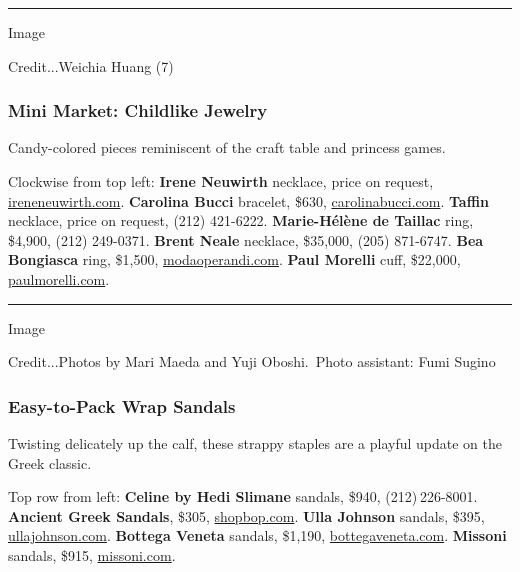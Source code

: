 \begin{center}\rule{0.5\linewidth}{\linethickness}\end{center}

Image

Credit...Weichia Huang (7)

\hypertarget{mini-market-childlike-jewelry}{%
\subsubsection{Mini Market: Childlike
Jewelry}\label{mini-market-childlike-jewelry}}

Candy-colored pieces reminiscent of the craft table and princess games.

Clockwise from top left: \textbf{Irene Neuwirth} necklace, price on
request, \href{https://ireneneuwirth.com/}{ireneneuwirth.com}.
\textbf{Carolina Bucci} bracelet, \$630,
\href{https://carolinabucci.com/}{carolinabucci.com}. \textbf{Taffin}
necklace, price on request, (212) 421-6222. \textbf{Marie-Hélène de
Taillac} ring, \$4,900, (212) 249-0371. \textbf{Brent Neale} necklace,
\$35,000, (205) 871-6747. \textbf{Bea Bongiasca} ring, \$1,500,
\href{https://www.modaoperandi.com/women}{modaoperandi.com}.
\textbf{Paul Morelli} cuff, \$22,000,
\href{http://paulmorelli.com/}{paulmorelli.com}.

\begin{center}\rule{0.5\linewidth}{\linethickness}\end{center}

Image

Credit...Photos by Mari Maeda and Yuji Oboshi.~Photo assistant: Fumi
Sugino

\hypertarget{easy-to-pack-wrap-sandals}{%
\subsubsection{Easy-to-Pack Wrap
Sandals}\label{easy-to-pack-wrap-sandals}}

Twisting delicately up the calf, these strappy staples are a playful
update on the Greek classic.

Top row from left: \textbf{Celine by Hedi Slimane} sandals, \$940,
(212) 226-8001. \textbf{Ancient Greek Sandals}, \$305,
\href{https://www.shopbop.com/}{shopbop.com}. \textbf{Ulla Johnson}
sandals, \$395, \href{https://ullajohnson.com/}{ullajohnson.com}.
\textbf{Bottega Veneta} sandals, \$1,190,
\href{https://www.bottegaveneta.com/us}{bottegaveneta.com}.
\textbf{Missoni} sandals, \$915,
\href{https://www.missoni.com/us}{missoni.com}.


